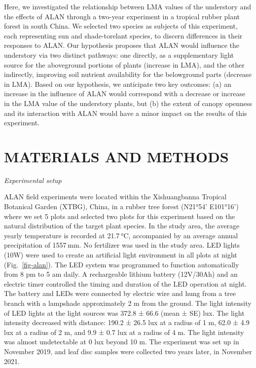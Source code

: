 \documentclass[
  12pt,
  letterpaper,
  DIV=11,
  numbers=noendperiod]{scrartcl}
\begin{document}
Here, we investigated the relationship between LMA values of the
understory and the effects of ALAN through a two-year experiment in a
tropical rubber plant forest in south China. We selected two species as
subjects of this experiment, each representing sun and shade-torelant
species, to discern differences in their responses to ALAN. Our
hypothesis proposes that ALAN would influence the understory via two
distinct pathways: one directly, as a supplementary light source for the
aboveground portions of plants (increase in LMA), and the other
indirectly, improving soil nutrient availability for the belowground
parts (decrease in LMA). Based on our hypothesis, we anticipate two key
outcomes: (a) an increase in the influence of ALAN would correspond with
a decrease or increase in the LMA value of the understory plants, but
(b) the extent of canopy openness and its interaction with ALAN would
have a minor impact on the results of this experiment.

\hypertarget{materials-and-methods}{%
\section{MATERIALS AND METHODS}\label{materials-and-methods}}

\emph{Experimental setup}

ALAN field experiments were located within the Xishuangbanna Tropical
Botanical Garden (XTBG), China, in a rubber tree forest (N21°54'
E101°16') where we set 5 plots and selected two plots for this
experiment based on the natural distribution of the target plant
species. In the study area, the average yearly temperature is recorded
at 21.7 °C, accompanied by an average annual precipitation of 1557 mm.
No fertilizer was used in the study area. LED lights (10W) were used to
create an artificial light environment in all plots at night
(Fig.~\ref{fig-alan}). The LED system was programmed to function
automatically from 8 pm to 5 am daily. A rechargeable lithium battery
(12V/30Ah) and an electric timer controlled the timing and duration of
the LED operation at night. The battery and LEDs were connected by
electric wire and hung from a tree branch with a lampshade approximately
2 m from the ground. The light intensity of LED lights at the light
sources was 372.8 ± 66.6 (mean ± SE) lux. The light intensity decreased
with distance: 190.2 ± 26.5 lux at a radius of 1 m, 62.0 ± 4.9 lux at a
radius of 2 m, and 9.9 ± 0.7 lux at a radius of 4 m. The light intensity
was almost undetectable at 0 lux beyond 10 m. The experiment was set up
in November 2019, and leaf disc samples were collected two years later,
in November 2021.
\end{document}
